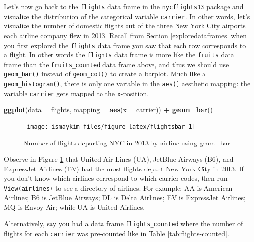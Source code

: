 \documentclass[12pt, krantz2,]{krantz}
\makeatletter
\newenvironment{Shaded}{\begin{snugshade}}{\end{snugshade}}
\newcommand{\DataTypeTok}[1]{\textcolor[rgb]{0.27,0.27,0.27}{#1}}
\newcommand{\KeywordTok}[1]{\textcolor[rgb]{0.27,0.27,0.27}{\textbf{#1}}}
\newcommand{\NormalTok}[1]{#1}
\newcommand{\OperatorTok}[1]{\textcolor[rgb]{0.43,0.43,0.43}{\textbf{#1}}}
\newcommand{\StringTok}[1]{\textcolor[rgb]{0.5,0.5,0.5}{#1}}
\newenvironment{kframe}{%
\medskip{}
\setlength{\fboxsep}{.8em}
 \def\at@end@of@kframe{}%
 \ifinner\ifhmode%
  \def\at@end@of@kframe{\end{minipage}}%
  \begin{minipage}{\columnwidth}%
 \fi\fi%
 \def\FrameCommand##1{\hskip\@totalleftmargin \hskip-\fboxsep
 \colorbox{shadecolor}{##1}\hskip-\fboxsep
     \hskip-\linewidth \hskip-\@totalleftmargin \hskip\columnwidth}%
 \MakeFramed {\advance\hsize-\width
   \@totalleftmargin\z@ \linewidth\hsize
   \@setminipage}}%
 {\par\unskip\endMakeFramed%
 \at@end@of@kframe}
\renewenvironment{Shaded}{\begin{kframe}}{\end{kframe}}
\makeatother
\begin{document}
Let's now go back to the \texttt{flights} data frame in the \texttt{nycflights13} package and visualize the distribution of the categorical variable \texttt{carrier}. In other words, let's visualize the number of domestic flights out of the three New York City airports each airline company flew in 2013. Recall from Section \ref{exploredataframes} when you first explored the \texttt{flights} data frame you saw that each row corresponds to a flight. In other words the \texttt{flights} data frame is more like the \texttt{fruits} data frame than the \texttt{fruits\_counted} data frame above, and thus we should use \texttt{geom\_bar()} instead of \texttt{geom\_col()} to create a barplot. Much like a \texttt{geom\_histogram()}, there is only one variable in the \texttt{aes()} aesthetic mapping: the variable \texttt{carrier} gets mapped to the \texttt{x}-position.



\begin{Shaded}
\begin{Highlighting}[]
\KeywordTok{ggplot}\NormalTok{(}\DataTypeTok{data =}\NormalTok{ flights, }\DataTypeTok{mapping =} \KeywordTok{aes}\NormalTok{(}\DataTypeTok{x =}\NormalTok{ carrier)) }\OperatorTok{+}
\StringTok{  }\KeywordTok{geom_bar}\NormalTok{()}
\end{Highlighting}
\end{Shaded}

\begin{figure}

{\centering \texttt{[image: ismaykim\_files/figure-latex/flightsbar-1]} 

}

\caption{Number of flights departing NYC in 2013 by airline using geom\_bar}\label{fig:flightsbar}
\end{figure}

Observe in Figure \ref{fig:flightsbar} that United Air Lines (UA), JetBlue Airways (B6), and ExpressJet Airlines (EV) had the most flights depart New York City in 2013. If you don't know which airlines correspond to which carrier codes, then run \texttt{View(airlines)} to see a directory of airlines. For example: AA is American Airlines; B6 is JetBlue Airways; DL is Delta Airlines; EV is ExpressJet Airlines; MQ is Envoy Air; while UA is United Airlines.

Alternatively, say you had a data frame \texttt{flights\_counted} where the number of flights for each \texttt{carrier} was pre-counted like in Table \ref{tab:flights-counted}.
\end{document}
